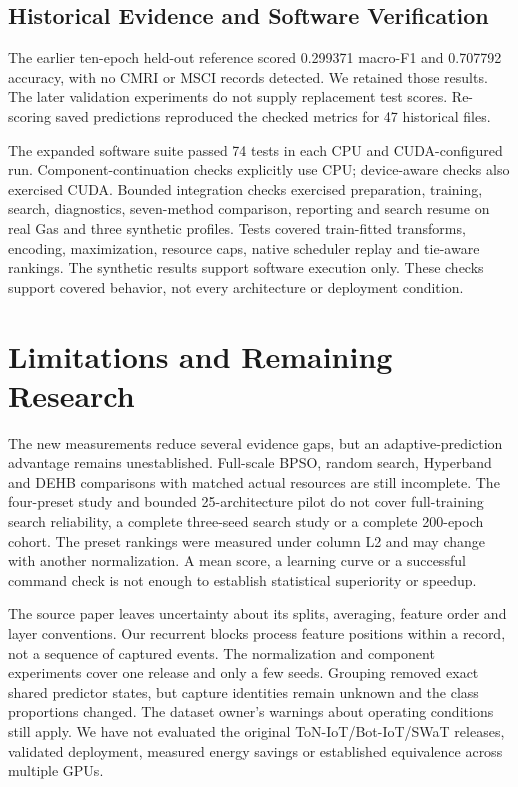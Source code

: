 


\subsection{Historical Evidence and Software Verification}
The earlier ten-epoch held-out reference scored 0.299371 macro-F1 and 0.707792 accuracy, with no CMRI or MSCI records detected. We retained those results. The later validation experiments do not supply replacement test scores. Re-scoring saved predictions reproduced the checked metrics for 47 historical files.

The expanded software suite passed 74 tests in each CPU and CUDA-configured run. Component-continuation checks explicitly use CPU; device-aware checks also exercised CUDA. Bounded integration checks exercised preparation, training, search, diagnostics, seven-method comparison, reporting and search resume on real Gas and three synthetic profiles. Tests covered train-fitted transforms, encoding, maximization, resource caps, native scheduler replay and tie-aware rankings. The synthetic results support software execution only. These checks support covered behavior, not every architecture or deployment condition.

\FloatBarrier


\section{Limitations and Remaining Research}
The new measurements reduce several evidence gaps, but an adaptive-prediction advantage remains unestablished. Full-scale BPSO, random search, Hyperband and DEHB comparisons with matched actual resources are still incomplete. The four-preset study and bounded 25-architecture pilot do not cover full-training search reliability, a complete three-seed search study or a complete 200-epoch cohort. The preset rankings were measured under column L2 and may change with another normalization. A mean score, a learning curve or a successful command check is not enough to establish statistical superiority or speedup.

The source paper leaves uncertainty about its splits, averaging, feature order and layer conventions. Our recurrent blocks process feature positions within a record, not a sequence of captured events. The normalization and component experiments cover one release and only a few seeds. Grouping removed exact shared predictor states, but capture identities remain unknown and the class proportions changed. The dataset owner's warnings about operating conditions~\cite{morrisdata,hsu2014} still apply. We have not evaluated the original ToN-IoT/Bot-IoT/SWaT releases, validated deployment, measured energy savings or established equivalence across multiple GPUs.

